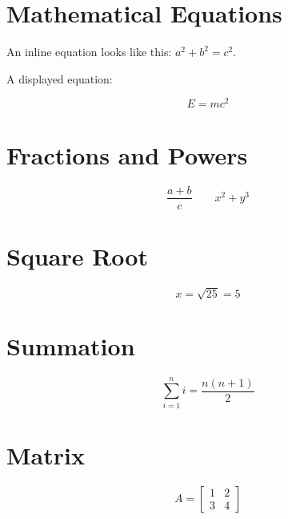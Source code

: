 \documentclass{article}
\begin{document}
\section{Mathematical Equations}

An inline equation looks like this: $a^2 + b^2 = c^2$.

A displayed equation:

\[
    E = mc^2
\]

\section{Fractions and Powers}

\[
    \frac{a+b}{c}
    \qquad
    x^2 + y^3
\]

\section{Square Root}

\[
    x = \sqrt{25} = 5
\]

\section{Summation}

\[
    \sum_{i=1}^{n} i = \frac{n(n+1)}{2}
\]

\section{Matrix}

\[
A =
\begin{bmatrix}
1 & 2 \\
3 & 4
\end{bmatrix}
\]
\end{document}

